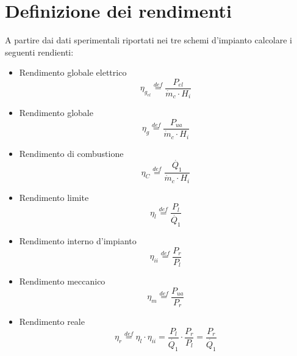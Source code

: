 \documentclass[a4paper,12pt]{article}
\begin{document}
\section{Definizione dei rendimenti}
A partire dai dati sperimentali riportati nei tre schemi d'impianto calcolare i seguenti rendienti:
\begin{itemize}
    \item Rendimento globale elettrico
    \begin{equation}
        \label{eq:rendimento_elettrico}
        \eta_{g_{el}} \stackrel{def}{=} \frac{P_{el}}{\dot m_c \cdot H_i}
    \end{equation}
    
    \item Rendimento globale
    \begin{equation}
        \label{eq:rendimento_globale}
        \eta_g \stackrel{def}{=} \frac{P_{ua}}{\dot{m}_c \cdot H_i}
   \end{equation}

   \item Rendimento di combustione
   \begin{equation}
       \label{eq:rendimento_combustione}
       \eta_C \stackrel{def}{=} \frac{\dot{Q_1}}{\dot{m}_c \cdot H_i}
   \end{equation}

   \item Rendimento limite
   \begin{equation}
       \label{eq:redimento_limite}
       \eta_l \stackrel{def}{=} \frac{P_l}{\dot{Q_1}}
   \end{equation}

   \item Rendimento interno d'impianto
   \begin{equation}
        \label{eq:rendimento_interno}
       \eta_{ii} \stackrel{def}{=} \frac{P_r}{P_l}
   \end{equation}

   \item Rendimento meccanico
   \begin{equation}
       \label{eq:rendimento_meccanico}
       \eta_m \stackrel{def}{=} \frac{P_{ua}}{P_r}
   \end{equation}

   \item Rendimento reale
   \begin{equation}
       \label{eq:rendimento_reale}
       \eta_r \stackrel{def}{=} \eta_l \cdot \eta_{ii} = \frac{P_l}{\dot{Q_1}} \cdot \frac{P_r}{P_l} = \frac{P_r}{\dot{Q_1}}
   \end{equation}


\end{itemize}
\end{document}
